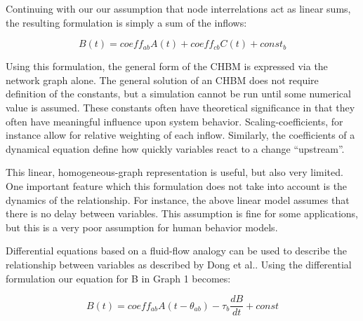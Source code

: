 \documentclass[runningheads,a4paper]{llncs}
\begin{document}
Continuing with our our assumption that node interrelations act as linear sums, the resulting formulation is simply a sum of the inflows:

\begin{equation}
    B(t) = coeff_{ab}A(t) + coeff_{cb}C(t) + const_b
    \label{linear-formulation}
\end{equation}

Using this formulation, the general form of the CHBM is expressed via the network graph alone.
The general solution of an CHBM does not require definition of the constants, but a simulation cannot be run until some numerical value is assumed. 
These constants often have theoretical significance in that they often have meaningful influence upon system behavior. 
Scaling-coefficients, for instance allow for relative weighting of each inflow. 
Similarly, the coefficients of a dynamical equation define how quickly variables react to a change ``upstream''.

This linear, homogeneous-graph representation is useful, but also very limited.
One important feature which this formulation does not take into account is the dynamics of the relationship.
For instance, the above linear model assumes that there is no delay between variables.
This assumption is fine for some applications, but this is a very poor assumption for human behavior models. 

Differential equations based on a fluid-flow analogy can be used to describe the relationship between variables as described by Dong et al.\cite{dongrivera2012dynamical}. 
Using the differential formulation our equation for B in Graph 1 becomes:

\begin{equation}
    B(t) = coeff_{ab}A(t-\theta_{ab}) - \tau_{b}\frac{dB}{dt} + const
    \label{fluid-flow-eq}
\end{equation}
\end{document}
